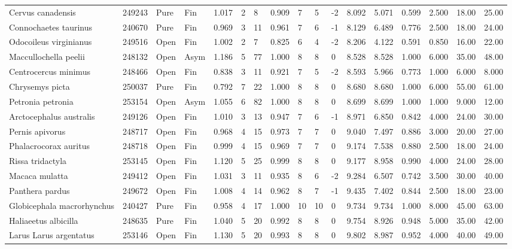 \documentclass[10pt,a4paper]{amsart}
\theoremstyle{definition}
\theoremstyle{remark}
\numberwithin{equation}{section}
\begin{document}
\begin{table}[ht]
{\begin{tabular}{lllllllllllllllll}
Cervus canadensis & 249243 & Pure & Fin & 1.017 & 2 & 8 & 0.909 & 7 & 5 & -2 & 8.092 & 5.071 & 0.599 & 2.500 & 18.00 & 25.00 \\
Connochaetes taurinus & 240670 & Pure & Fin & 0.969 & 3 & 11 & 0.961 & 7 & 6 & -1 & 8.129 & 6.489 & 0.776 & 2.500 & 18.00 & 24.00 \\
Odocoileus virginianus & 249516 & Open & Fin & 1.002 & 2 & 7 & 0.825 & 6 & 4 & -2 & 8.206 & 4.122 & 0.591 & 0.850 & 16.00 & 22.00 \\
Maccullochella peelii & 248132 & Open & Asym & 1.186 & 5 & 77 & 1.000 & 8 & 8 & 0 & 8.528 & 8.528 & 1.000 & 6.000 & 35.00 & 48.00 \\
Centrocercus minimus & 248466 & Open & Fin & 0.838 & 3 & 11 & 0.921 & 7 & 5 & -2 & 8.593 & 5.966 & 0.773 & 1.000 & 6.000 & 8.000 \\
Chrysemys picta & 250037 & Pure & Fin & 0.792 & 7 & 22 & 1.000 & 8 & 8 & 0 & 8.680 & 8.680 & 1.000 & 6.000 & 55.00 & 61.00 \\
Petronia petronia & 253154 & Open & Asym & 1.055 & 6 & 82 & 1.000 & 8 & 8 & 0 & 8.699 & 8.699 & 1.000 & 1.000 & 9.000 & 12.00 \\
Arctocephalus australis & 249126 & Open & Fin & 1.010 & 3 & 13 & 0.947 & 7 & 6 & -1 & 8.971 & 6.850 & 0.842 & 4.000 & 24.00 & 30.00 \\
Pernis apivorus & 248717 & Open & Fin & 0.968 & 4 & 15 & 0.973 & 7 & 7 & 0 & 9.040 & 7.497 & 0.886 & 3.000 & 20.00 & 27.00 \\
Phalacrocorax auritus & 248718 & Open & Fin & 0.999 & 4 & 15 & 0.969 & 7 & 7 & 0 & 9.174 & 7.538 & 0.880 & 2.500 & 18.00 & 24.00 \\
Rissa tridactyla & 253145 & Open & Fin & 1.120 & 5 & 25 & 0.999 & 8 & 8 & 0 & 9.177 & 8.958 & 0.990 & 4.000 & 24.00 & 28.00 \\
Macaca mulatta & 249412 & Open & Fin & 1.031 & 3 & 11 & 0.935 & 8 & 6 & -2 & 9.284 & 6.507 & 0.742 & 3.500 & 30.00 & 40.00 \\
Panthera pardus & 249672 & Open & Fin & 1.008 & 4 & 14 & 0.962 & 8 & 7 & -1 & 9.435 & 7.402 & 0.844 & 2.500 & 18.00 & 23.00 \\
Globicephala macrorhynchus & 240427 & Pure & Fin & 0.958 & 4 & 17 & 1.000 & 10 & 10 & 0 & 9.734 & 9.734 & 1.000 & 8.000 & 45.00 & 63.00 \\
Haliaeetus albicilla & 248635 & Pure & Fin & 1.040 & 5 & 20 & 0.992 & 8 & 8 & 0 & 9.754 & 8.926 & 0.948 & 5.000 & 35.00 & 42.00 \\
Larus Larus argentatus & 253146 & Open & Fin & 1.130 & 5 & 20 & 0.993 & 8 & 8 & 0 & 9.802 & 8.987 & 0.952 & 4.000 & 40.00 & 49.00 \\

\end{tabular}}
\end{table}
\end{document}

